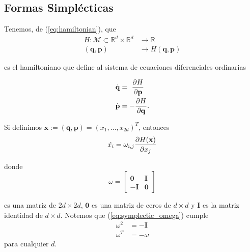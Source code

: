 
\subsection{Formas Simplécticas}
\label{sec:formas-simplecticas}

Tenemos, de (\ref{eq:hamiltonian}), que
\begin{align*}
H: \mathcal{M} \subset \mathbb{R}^d\times\mathbb{R}^d &\to \mathbb{R} \\ 
	(\mathbf{q},\mathbf{p}) &\to H(\mathbf{q},\mathbf{p})
\end{align*}

es el hamiltoniano que define al sistema de ecuaciones diferenciales ordinarias

\begin{align*}
 \dot{\mathbf{q}} &= \ \frac{\partial H}{\partial \mathbf{p}} \\
 \dot{\mathbf{p}} &= - \frac{\partial H}{\partial \mathbf{q}}. 
\end{align*}

Si definimos $\mathbf{x} := (\mathbf{q},\mathbf{p}) = (x_1,\ldots,x_{2d})^T$, entonces
\begin{equation}
 \dot{x_i} = \omega_{i,j} \frac{\partial H(\mathbf{x})}{\partial x_j}
 \label{eq:symplectic_ham_ode}
\end{equation}

donde
\begin{equation}
 \omega = 
    \begin{bmatrix}
    \mathbf{0} & \mathbf{I} \\
    -\mathbf{I} & \mathbf{0}
  \end{bmatrix}
 \label{eq:symplectic_omega}
\end{equation}

es una matriz de $2d\times 2d$, $\mathbf{0}$ es una matriz de ceros de $d\times d$ y $\mathbf{I}$ es la matriz identidad de $d\times d$. Notemos que (\ref{eq:symplectic_omega}) cumple
\begin{align}
 \omega^2 &= -\mathbf{I}  \nonumber \\
 \omega^T &= -\omega
 \label{eq:omega_properties}
\end{align}
para cualquier $d$.

